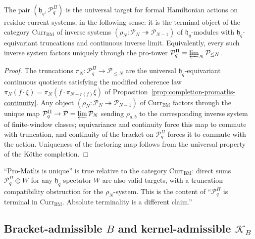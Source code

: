 \begin{thm}
\label{thm:completion-native-promatlis}
The pair
\((\mathfrak h_q,\mathcal P^\Pi_q)\) is the universal target for
formal Hamiltonian actions on residue-current systems, in the
following sense: it is the terminal object of the category
\(\mathrm{Curr}_{\mathrm{BM}}\) of inverse systems
\((\rho_N:\mathcal P_N\twoheadrightarrow\mathcal P_{N-1})\) of
\(\mathfrak h_q\)-modules with \(\mathfrak h_q\)-equivariant
truncations and continuous inverse limit.  Equivalently, every such
inverse system factors uniquely through the pro-tower
\(\mathcal P^\Pi_q=\varprojlim_N\mathcal P_{\le N}\).
\end{thm}

\begin{proof}
The truncations \(\pi_N:\mathcal P^\Pi_q\to\mathcal P_{\le N}\) are
the universal \(\mathfrak h_q\)-equivariant continuous quotients
satisfying the modified coherence law
\(\pi_N(f\cdot\xi)=\pi_N(f\cdot\pi_{N+r(f)}\xi)\) of
Proposition~\ref{prop:completion-promatlis-continuity}.  Any object
\((\rho_N:\mathcal P_N\twoheadrightarrow\mathcal P_{N-1})\) of
\(\mathrm{Curr}_{\mathrm{BM}}\) factors through the unique map
\(\mathcal P^\Pi_q\to\mathcal P=\varprojlim\mathcal P_N\) sending
\(\rho_{a,b}\) to the corresponding inverse system of finite-window
classes; equivariance and continuity force this map to commute with
truncation, and continuity of the bracket on \(\mathcal P^\Pi_q\)
forces it to commute with the action.  Uniqueness of the factoring
map follows from the universal property of the K\"othe completion.
\end{proof}

\begin{rmk}
\label{rmk:completion-currbm-category}
``Pro-Matlis is unique'' is true relative to the category
\(\mathrm{Curr}_{\mathrm{BM}}\): direct sums
\(\mathcal P^\Pi_q\oplus W\) for any \(\mathfrak h_q\)-spectator
\(W\) are also valid targets, with a truncation-compatibility obstruction
for the \(\rho_N\)-system.  This is the
content of ``\(\mathcal P^\Pi_q\) is terminal in
\(\mathrm{Curr}_{\mathrm{BM}}\). Absolute terminality is a different
claim.''
\end{rmk}

\subsection{\texorpdfstring{Bracket-admissible \(B\) and kernel-admissible \(\mathcal K_B\)}{Bracket-admissible B and kernel-admissible K-B}}
\label{ssec:completion-bracket-kernel-admissible}

